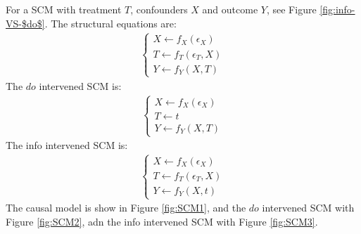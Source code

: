 \begin{Eg}
	\label{eg1}
	For a SCM with treatment $T$, confounders $X$ and outcome $Y$, see Figure \ref{fig:info-VS-$do$}.  The structural equations are:
	$$
	\begin{aligned}
	\begin{cases}
	X \leftarrow f_X(\epsilon_X)  \\
	T \leftarrow f_T(\epsilon_T, X) \\
	Y \leftarrow f_Y(X, T)
	\end{cases}
	\end{aligned}
	$$    
	The $do$ intervened SCM is: 
	$$
	\begin{aligned}
	\begin{cases}
	X \leftarrow f_X(\epsilon_X)  \\
	T \leftarrow t \\
	Y \leftarrow f_Y(X, T)
	\end{cases}
	\end{aligned}
	$$    	
	The info intervened SCM is: 
	$$
	\begin{aligned}
	\begin{cases}
	X \leftarrow f_X(\epsilon_X)  \\
	T \leftarrow f_T(\epsilon_T, X) \\
	Y \leftarrow f_Y(X, t) 
	\end{cases}
	\end{aligned}
	$$ 
	 The causal model is show in Figure \ref{fig:SCM1}, and the $do$ intervened SCM with Figure  \ref{fig:SCM2}, adn the info intervened SCM with Figure \ref{fig:SCM3}. 
	
\end{Eg}


